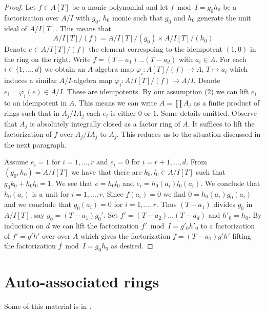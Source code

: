 \begin{proof}
Let $f \in A[T]$ be a monic polynomial and let
$f \bmod I = g_0 h_0$ be a factorization over $A/I$
with $g_0$, $h_0$ monic such that
$g_0$ and $h_0$ generate the unit ideal of $A/I[T]$.
This means that
$$
A/I[T]/(f) = A/I[T]/(g_0) \times A/I[T]/(h_0)
$$
Denote $e \in A/I[T]/(f)$ the element correspoing to the
idempotent $(1, 0)$ in the ring on the right.
Write $f = (T - a_1) \ldots (T - a_d)$ with $a_i \in A$.
For each $i \in \{1, \ldots, d\}$ we obtain an $A$-algebra map
$\varphi_i : A[T]/(f) \to A$, $T \mapsto a_i$ which induces
a similar $A/I$-algebra map $\overline{\varphi}_i : A/I[T]/(f) \to A/I$.
Denote $e_i = \overline{\varphi}_i(e) \in A/I$. These are idempotents.
By our assumption (2) we can lift $e_i$ to an idempotent in $A$.
This means we can write $A = \prod A_j$ as a finite product of
rings such that in $A_j/IA_j$ each $e_i$ is either $0$ or $1$.
Some details omitted. Observe that $A_j$ is absolutely integrally
closed as a factor ring of $A$. It suffices to lift the factorization
of $f$ over $A_j/IA_j$ to $A_j$.
This reduces us to the situation discussed in the next paragraph.

\medskip\noindent
Assume $e_i = 1$ for $i = 1, \ldots, r$ and $e_i = 0$ for
$i = r + 1, \ldots, d$. From $(g_0, h_0) = A/I[T]$ we have that there are
$k_0, l_0 \in A/I[T]$ such that $g_0 k_0 + h_0 l_0 = 1$.
We see that $e = h_0 l_0$ and $e_i = h_0(a_i) l_0(a_i)$.
We conclude that $h_0(a_i)$ is a unit for $i = 1, \dots ,r$.
Since $f(a_i) = 0$ we find $0 = h_0(a_i)g_0(a_i)$
and we conclude that $g_0(a_i) = 0$ for $i = 1, \ldots, r$.
Thus $(T - a_1)$ divides $g_0$ in $A/I[T]$, say
$g_0 = (T - a_1) g_0'$.
Set $f' = (T - a_2) \ldots (T - a_d)$ and $h'_0 = h_0$.
By induction on $d$ we can lift the factorization $f' \bmod I = g'_0 h'_0$
to a factorization of $f' = g' h'$ over over $A$ which
gives the factorization $f = (T - a_1) g' h'$
lifting the factorization $f \bmod I = g_0 h_0$
as desired.
\end{proof}









\section{Auto-associated rings}
\label{section-auto-ass}

\noindent
Some of this material is in \cite{Autour}.

